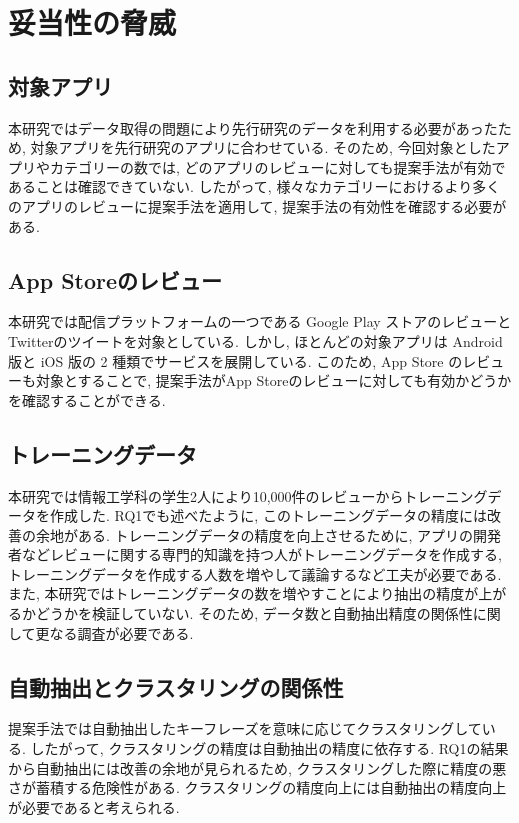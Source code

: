 \section{妥当性の脅威}
\subsection{対象アプリ}
本研究ではデータ取得の問題により先行研究のデータを利用する必要があったため, 対象アプリを先行研究のアプリに合わせている. そのため, 今回対象としたアプリやカテゴリーの数では, どのアプリのレビューに対しても提案手法が有効であることは確認できていない. 
したがって, 様々なカテゴリーにおけるより多くのアプリのレビューに提案手法を適用して, 提案手法の有効性を確認する必要がある. 

\subsection{App Storeのレビュー}
本研究では配信プラットフォームの一つである Google Play ストアのレビューとTwitterのツイートを対象としている. しかし, ほとんどの対象アプリは Android 版と iOS 版の 2 種類でサービスを展開している. 
このため, App Store のレビューも対象とすることで, 提案手法がApp Storeのレビューに対しても有効かどうかを確認することができる.

\subsection{トレーニングデータ}
本研究では情報工学科の学生2人により10,000件のレビューからトレーニングデータを作成した. RQ1でも述べたように, このトレーニングデータの精度には改善の余地がある. 
トレーニングデータの精度を向上させるために, アプリの開発者などレビューに関する専門的知識を持つ人がトレーニングデータを作成する, トレーニングデータを作成する人数を増やして議論するなど工夫が必要である. 
また, 本研究ではトレーニングデータの数を増やすことにより抽出の精度が上がるかどうかを検証していない. そのため, データ数と自動抽出精度の関係性に関して更なる調査が必要である. 

\subsection{自動抽出とクラスタリングの関係性}
提案手法では自動抽出したキーフレーズを意味に応じてクラスタリングしている. したがって, クラスタリングの精度は自動抽出の精度に依存する. 
RQ1の結果から自動抽出には改善の余地が見られるため, クラスタリングした際に精度の悪さが蓄積する危険性がある. クラスタリングの精度向上には自動抽出の精度向上が必要であると考えられる. 